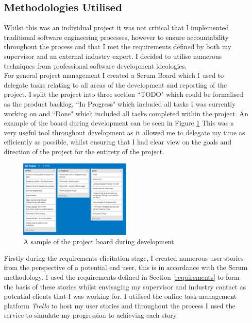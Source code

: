 \documentclass[12pt]{article}
\begin{document}
\subsection{Methodologies Utilised}
Whilst this was an individual project it was not critical that I implemented traditional software engineering processes, however to ensure accountability throughout the process and that I met the requirements defined by both my supervisor and an external industry expert. I decided to utilise numerous techniques from professional software development ideologies. \\

For general project management I created a Scrum Board which I used to delegate tasks relating to all areas of the development and reporting of the project. I split the project into three section ``TODO" which could be formalised as the product backlog, ``In Progress" which included all tasks I was currently working on and ``Done" which included all tasks completed within the project. An example of the board during development can be seen in Figure \ref{fig:Project_Board} This was a very useful tool throughout development as it allowed me to delegate my time as efficiently as possible, whilst ensuring that I had clear view on the goals and direction of the project for the entirety of the project. \\

\begin{figure}[H]
    \centering
    \includegraphics[width=0.5\textwidth]{Project_Board.png}
    \caption{A sample of the project board during development}
    \label{fig:Project_Board}
\end{figure}

Firstly during the requirements elicitation stage, I created numerous user stories from the perspective of a potential end user, this is in accordance with the Scrum methodology. I used the requirements defined in Section \ref{requirements} to form the basis of these stories whilst envisaging my supervisor and industry contact as potential clients that I was working for. I utilised the online task management platform \textit{Trello} to host my user stories and throughout the process I used the service to simulate my progression to achieving each story.
\end{document}
